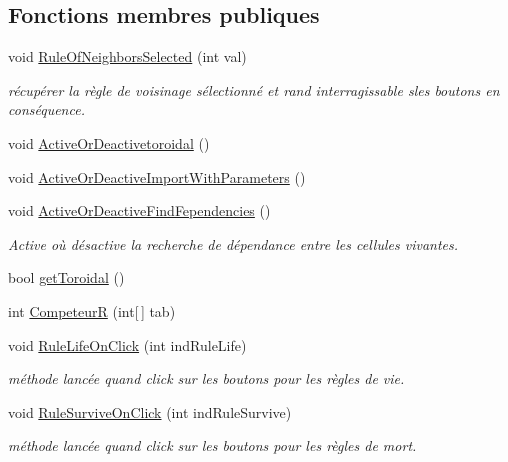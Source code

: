 \subsection*{Fonctions membres publiques}
\begin{DoxyCompactItemize}
\item 
void \mbox{\hyperlink{class_parameters_af47f2d06943667d50ffbc35743ad522c}{Rule\+Of\+Neighbors\+Selected}} (int val)
\begin{DoxyCompactList}\small\item\em récupérer la règle de voisinage sélectionné et rand interragissable sles boutons en conséquence. \end{DoxyCompactList}\item 
void \mbox{\hyperlink{class_parameters_aed80d6c22fb47d55466f2feff304c87b}{Active\+Or\+Deactivetoroidal}} ()
\item 
void \mbox{\hyperlink{class_parameters_a4566221c7993c122d2d32682530f1083}{Active\+Or\+Deactive\+Import\+With\+Parameters}} ()
\item 
void \mbox{\hyperlink{class_parameters_a23cd831787b627f7ec96da88a774838d}{Active\+Or\+Deactive\+Find\+Fependencies}} ()
\begin{DoxyCompactList}\small\item\em Active où désactive la recherche de dépendance entre les cellules vivantes. \end{DoxyCompactList}\item 
bool \mbox{\hyperlink{class_parameters_aa6714e2b56d3511340476f682a51e677}{get\+Toroidal}} ()
\item 
int \mbox{\hyperlink{class_parameters_a9eb50f6a67cb480f303e5d6f91997f7d}{CompeteurR}} (int\mbox{[}$\,$\mbox{]} tab)
\item 
void \mbox{\hyperlink{class_parameters_ae90c0f90420620d98950ac50b9f24782}{Rule\+Life\+On\+Click}} (int ind\+Rule\+Life)
\begin{DoxyCompactList}\small\item\em méthode lancée quand click sur les boutons pour les règles de vie. \end{DoxyCompactList}\item 
void \mbox{\hyperlink{class_parameters_af62c0383d55e0653fcd2384b9d49d42f}{Rule\+Survive\+On\+Click}} (int ind\+Rule\+Survive)
\begin{DoxyCompactList}\small\item\em méthode lancée quand click sur les boutons pour les règles de mort. \end{DoxyCompactList}\item 

\end{DoxyCompactItemize}
